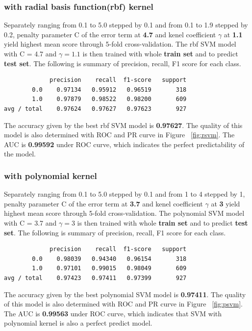 \documentclass{article}
\begin{document}
\begin{singlespacing}
\subsubsection{with radial basis function(rbf) kernel}
Separately ranging from 0.1 to 5.0 stepped by 0.1 and from 0.1 to 1.9 stepped by 0.2, penalty parameter C of the error term at \textbf{4.7} and kenel coefficient $\gamma$ at \textbf{1.1} yield highest mean score through 5-fold cross-validation. The rbf SVM model with C = 4.7 and $\gamma = 1.1 $ is then trained with  whole \textbf{train set} and to predict \textbf{test set}. The following is summary of precision, recall, F1 score for each class.
\begin{lstlisting}
             precision    recall  f1-score   support
        0.0    0.97134   0.95912   0.96519       318
        1.0    0.97879   0.98522   0.98200       609
avg / total    0.97624   0.97627   0.97623       927
\end{lstlisting}
The accuracy given by the best rbf SVM model is \textbf{0.97627}. The quality of this model is also determined with ROC and PR curve in Figure ~\ref{fig:rsvm}. The AUC is \textbf{0.99592} under ROC curve, which indicates the perfect predictability of the model.

\subsubsection{with polynomial kernel}
Separately ranging from 0.1 to 5.0 stepped by 0.1 and from 1 to 4 stepped by 1, penalty parameter C of the error term at \textbf{3.7} and kenel coefficient $\gamma$ at \textbf{3} yield highest mean score through 5-fold cross-validation. The polynomial SVM model with C = 3.7 and $\gamma = 3 $ is then trained with  whole \textbf{train set} and to predict \textbf{test set}. The following is summary of precision, recall, F1 score for each class.
\begin{lstlisting}
             precision    recall  f1-score   support
        0.0    0.98039   0.94340   0.96154       318
        1.0    0.97101   0.99015   0.98049       609
avg / total    0.97423   0.97411   0.97399       927
\end{lstlisting}
The accuracy given by the best polynomial SVM model is \textbf{0.97411}. The quality of this model is also determined with ROC and PR curve in Figure ~\ref{fig:psvm}. The AUC is \textbf{0.99563} under ROC curve, which indicates that SVM with polynomial kernel is also a perfect predict model.


\end{singlespacing}
\end{document}
